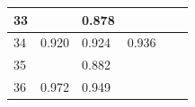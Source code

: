 \begin{longtable}{l|l|l|l|l|l}
33 &                                                                                                         & 0.878                                                                                                                                                                                                                                     &                                                                                                        &                                                                                                        &                                                                                                     \\ \hline
34 & 0.920                                                                                                   & 0.924                                                                                                                                                                                                                                     & 0.936                                                                                                  &                                                                                                        &                                                                                                     \\ \hline
35 &                                                                                                         & 0.882                                                                                                                                                                                                                                     &                                                                                                        &                                                                                                        &                                                                                                     \\ \hline
36 & 0.972                                                                                                   & 0.949                                                                                                                                                                                                                                     &                                                                                                        &                                                                                                        &                                                                                                     \\ \hline

\end{longtable}
